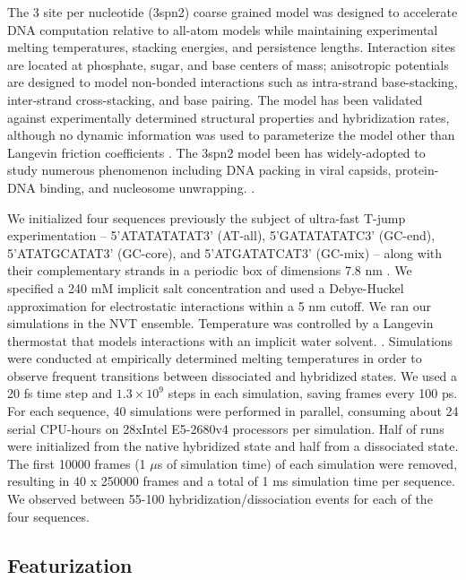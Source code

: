 \documentclass[journal=jpcbfk,manuscript=article]{achemso}
\begin{document}
The 3 site per nucleotide (3spn2) coarse grained model was designed to accelerate DNA computation relative to all-atom models while maintaining experimental melting temperatures, stacking energies, and persistence lengths\citep{Hinckley2013AnHybridization}. Interaction sites are located at phosphate, sugar, and base centers of mass; anisotropic potentials are designed to model non-bonded interactions such as intra-strand base-stacking, inter-strand cross-stacking, and base pairing. The model has been validated against experimentally determined structural properties and hybridization rates, although no dynamic information was used to parameterize the model other than Langevin friction coefficients \citep{Hinckley2013AnHybridization, Hinckley2014Coarse-grainedEffects}. The 3spn2 model been has widely-adopted to study numerous phenomenon including DNA packing in viral capsids, protein-DNA binding, and nucleosome unwrapping. \citep{Cordoba2017AIons, Lu2020OpenAWSEMSummary, Lequieu2016Tension-dependentUnwrapping}. 

We initialized four sequences previously the subject of ultra-fast T-jump experimentation -- 5'ATATATATAT3' (AT-all), 5'GATATATATC3' (GC-end), 5'ATATGCATAT3' (GC-core), and 5'ATGATATCAT3' (GC-mix) -- along with their complementary strands in a periodic box of dimensions 7.8 nm \citep{Sanstead2016, Phys2014}. We specified a 240 mM implicit salt concentration and used a Debye-Huckel approximation for electrostatic interactions within a 5 nm cutoff. We ran our simulations in the NVT ensemble. Temperature was controlled by a Langevin thermostat that models interactions with an implicit water solvent. \citep{Schneider1978Molecular-dynamicsTransitions}. Simulations were conducted at empirically determined  melting temperatures in order to observe frequent transitions between dissociated and hybridized states. We used a 20 fs time step and $1.3\times10^{9}$ steps in each simulation, saving frames every 100 ps. For each sequence, 40 simulations were performed in parallel, consuming about 24 serial CPU-hours on 28xIntel E5-2680v4 processors per simulation. Half of runs were initialized from the native hybridized state and half from a dissociated state. The first 10000 frames (1 $\mu$s of simulation time) of each simulation were removed, resulting in 40 x 250000 frames and a total of 1 ms simulation time per sequence. We observed between 55-100 hybridization/dissociation events for each of the four sequences.

\subsection{\label{sec:methods}Featurization}
\end{document}
